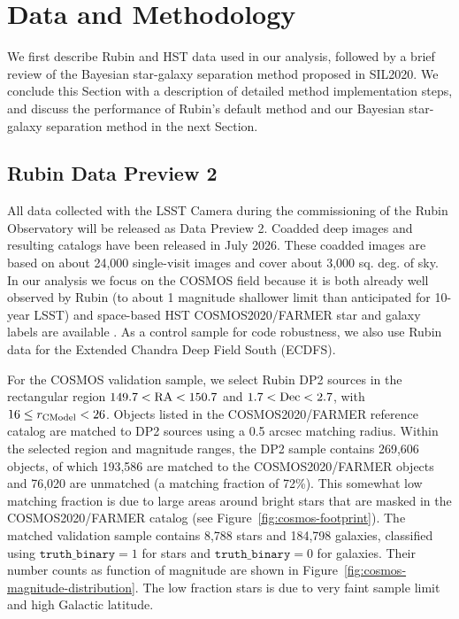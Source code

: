 \providecommand{\FloatBarrier}{\clearpage}
\renewcommand{\topfraction}{0.92}
\renewcommand{\bottomfraction}{0.85}
\renewcommand{\textfraction}{0.06}
\renewcommand{\floatpagefraction}{0.75}
\setcounter{topnumber}{3}
\setcounter{bottomnumber}{2}
\setcounter{totalnumber}{5}


\section{Data and Methodology}
\label{sec:data-methods}

We first describe Rubin and HST data used in our analysis, followed by a brief review of the Bayesian star-galaxy
separation method proposed in SIL2020. We conclude this Section with a description of detailed method
implementation steps, and discuss the performance of Rubin's default method and our Bayesian star-galaxy
separation method in the next Section. 


\subsection{Rubin Data Preview 2} 
\label{sec:data}

All data collected with the LSST Camera during the commissioning of the Rubin Observatory
will be released as Data Preview 2. Coadded deep images and resulting catalogs have been released
in July 2026. These coadded images are based on about 24,000 single-visit images and cover about
3,000 sq. deg. of sky. In our analysis we focus on the COSMOS field because it is both already well observed
by Rubin (to about 1 magnitude shallower limit than anticipated for 10-year LSST) and space-based HST
COSMOS2020/FARMER star and galaxy labels are available \citep{2022ApJS..258...11W}. As a control
sample for code robustness, we also use Rubin data for the Extended Chandra Deep Field South (ECDFS). 

For the COSMOS validation sample, we select Rubin DP2 sources in the rectangular region
\(149.7 < {\rm RA} < 150.7\) and \(1.7 < {\rm Dec} < 2.7\), with
\(16 \le r_{\rm CModel} < 26\). Objects listed in the COSMOS2020/FARMER reference catalog are
matched to DP2 sources using a 0.5 arcsec matching radius. Within the selected region and magnitude
ranges, the DP2 sample contains 269,606 objects, of which 193,586 are matched to the
COSMOS2020/FARMER objects and 76,020 are unmatched (a matching fraction of 72\%). This
somewhat low matching fraction is due to large areas around bright stars that are masked in the
COSMOS2020/FARMER catalog (see Figure~\ref{fig:cosmos-footprint}). 
The matched validation sample contains 8,788 stars and 184,798 galaxies, classified using
\(\texttt{truth\_binary}=1\) for stars and \(\texttt{truth\_binary}=0\) for galaxies. Their number
counts as function of magnitude are shown in Figure~\ref{fig:cosmos-magnitude-distribution}.
The low fraction stars is due to very faint sample limit and high Galactic latitude. 



